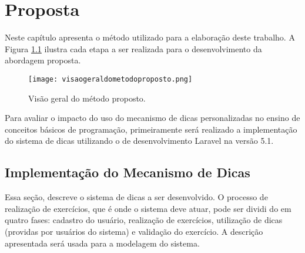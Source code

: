 \chapter{Proposta}

Neste capítulo apresenta o método utilizado para a elaboração deste trabalho. A Figura \ref{figura:visaometodo} ilustra cada etapa a ser realizada para o desenvolvimento da abordagem proposta.

\begin{figure}[h]
	\captionsetup{justification=centering}
	\texttt{[image: visaogeraldometodoproposto.png]}
	\caption{Visão geral do método proposto.}
	\label{figura:visaometodo}
\end{figure}

Para avaliar o impacto do uso do mecanismo de dicas personalizadas no ensino de conceitos básicos de programação, primeiramente será realizado a implementação do sistema de dicas utilizando o  de desenvolvimento Laravel na versão 5.1. 


\section{Implementação do Mecanismo de Dicas}

Essa seção, descreve o sistema de dicas a ser desenvolvido. O processo de realização de exercícios, que é onde o sistema deve atuar, pode ser dividi do em quatro fases: cadastro do usuário, realização de exercícios, utilização de dicas (providas por usuários do sistema) e validação do exercício. A descrição apresentada será usada para a modelagem do sistema.

